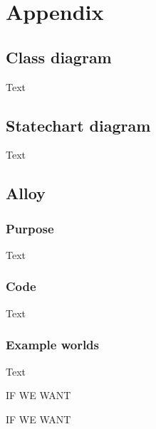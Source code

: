 \section{Appendix}
\subsection{Class diagram}
Text
\subsection{Statechart diagram}
Text
\subsection{Alloy}
\subsubsection{Purpose}
Text
\subsubsection{Code}
Text
\subsubsection{Example worlds}
Text

\listoffigures
IF WE WANT
\listoftables
IF WE WANT